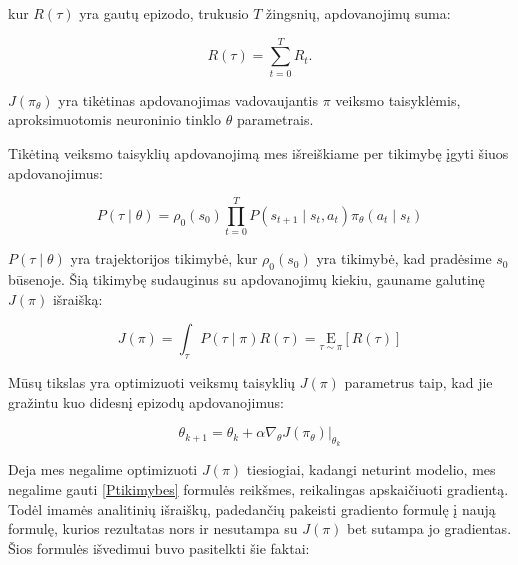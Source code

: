 \documentclass[a4paper, 12pt]{article}
\begin{document}
kur $R(\tau)$ yra gautų epizodo, trukusio $T$ žingsnių, apdovanojimų suma:

\begin{equation}
R(\tau) = \sum_{t=0}^{T} R_{t}.
\end{equation}

$J\left(\pi_{\theta}\right)$ yra tikėtinas apdovanojimas vadovaujantis $\pi$ veiksmo taisyklėmis, aproksimuotomis neuroninio tinklo $\theta$ parametrais.

Tikėtiną veiksmo taisyklių apdovanojimą mes išreiškiame per tikimybę įgyti šiuos apdovanojimus:

\begin{equation}
\label{Ptikimybes}
P(\tau \mid \theta)=\rho_{0}\left(s_{0}\right) \prod_{t=0}^{T} P\left(s_{t+1} \mid s_{t}, a_{t}\right) \pi_{\theta}\left(a_{t} \mid s_{t}\right)
\end{equation}

$P(\tau \mid \theta)$ yra trajektorijos tikimybė, kur $\rho_{0}\left(s_{0}\right)$ yra tikimybė, kad pradėsime $s_0$ būsenoje. Šią tikimybę sudauginus su apdovanojimų kiekiu, gauname galutinę $J(\pi)$ išraišką:

\begin{equation}
J(\pi)=\int_{\tau} P(\tau \mid \pi) R(\tau)=\underset{\tau \sim \pi}{\mathrm{E}}[R(\tau)]
\end{equation}

Mūsų tikslas yra optimizuoti veiksmų taisyklių $J(\pi)$ parametrus taip, kad jie gražintu kuo didesnį epizodų apdovanojimus:

\begin{equation}
\theta_{k+1}=\theta_{k}+\left.\alpha \nabla_{\theta} J\left(\pi_{\theta}\right)\right|_{\theta_{k}}
\end{equation}

Deja mes negalime optimizuoti $J(\pi)$ tiesiogiai, kadangi neturint modelio, mes negalime gauti \ref{Ptikimybes} formulės reikšmes, reikalingas apskaičiuoti gradientą. Todėl imamės analitinių išraiškų, padedančių pakeisti gradiento formulę į naują formulę, kurios rezultatas nors ir nesutampa su $J(\pi)$ bet sutampa jo gradientas. Šios formulės išvedimui buvo pasitelkti šie faktai:
\end{document}
